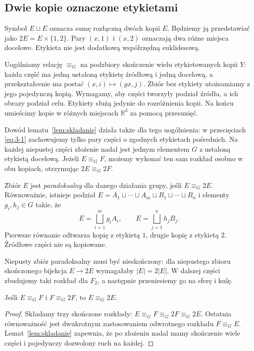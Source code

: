 \subsection{Dwie kopie oznaczone etykietami}
Symbol $E\sqcup E$ oznacza sumę rozłączną dwóch kopii $E$. Będziemy ją przedstawiać jako $2E=E\times\{1,2\}$. Pary $(x,1)$ i $(x,2)$ oznaczają dwa różne miejsca docelowe. Etykieta nie jest dodatkową współrzędną euklidesową.

Uogólniamy relację $\mathrel{\equiv_G}$ na podzbiory skończenie wielu etykietowanych kopii $Y$: każda część ma jedną ustaloną etykietę źródłową i jedną docelową, a przekształcenie ma postać $(x,i)\mapsto(gx,j)$. Zbiór bez etykiety utożsamiamy z jego pojedynczą kopią. Wymagamy, aby części tworzyły podział źródła, a ich obrazy podział celu. Etykiety służą jedynie do rozróżnienia kopii. Na końcu umieścimy kopie w różnych miejscach $\mathbb R^3$ za pomocą przesunięć.

Dowód lematu~\ref{lem:skladanie} działa także dla tego uogólnienia: w przecięciach \eqref{eq:3-1} zachowujemy tylko pary części o zgodnych etykietach pośrednich. Na każdej niepustej części złożenie nadal jest jednym elementem $G$ z ustaloną etykietą docelową. Jeżeli $E\mathrel{\equiv_G} F$, możemy wykonać ten sam rozkład osobno w obu kopiach, otrzymując $2E\mathrel{\equiv_G}2F$.
\begin{definicja}\label{def:paradoksalny}
Zbiór $E$ jest \emph{paradoksalny} dla danego działania grupy, jeśli $E\mathrel{\equiv_G}2E$. Równoważnie, istnieje podział $E=A_1\sqcup\cdots\sqcup A_m\sqcup B_1\sqcup\cdots\sqcup B_n$ i elementy $g_i,h_j\in G$ takie, że
\[
 E=\bigsqcup_{i=1}^{m}g_iA_i,\qquad E=\bigsqcup_{j=1}^{n}h_jB_j.
\]
Pierwsze równanie odtwarza kopię z etykietą $1$, drugie kopię z etykietą $2$. Źródłowe części nie są kopiowane.
\end{definicja}
Niepusty zbiór paradoksalny musi być nieskończony: dla niepustego zbioru skończonego bijekcja $E\to2E$ wymagałaby $|E|=2|E|$. W dalszej części zbudujemy taki rozkład dla $F_2$, a następnie przeniesiemy go na sferę i kulę.
\begin{wniosek}\label{wn:przenoszenie}
Jeśli $E\mathrel{\equiv_G} F$ i $F\mathrel{\equiv_G}2F$, to $E\mathrel{\equiv_G}2E$.
\end{wniosek}
\begin{proof}
Składamy trzy skończone rozkłady: $E\mathrel{\equiv_G} F\mathrel{\equiv_G}2F\mathrel{\equiv_G}2E$. Ostatnia równoważność jest dwukrotnym zastosowaniem odwrotnego rozkładu $F\mathrel{\equiv_G} E$. Lemat~\ref{lem:skladanie} zapewnia, że po złożeniu nadal mamy skończenie wiele części i pojedynczy dozwolony ruch na każdej.
\end{proof}
